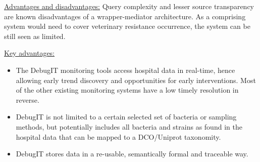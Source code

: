 \uline{Advantages and disadvantages:} Query complexity and lesser source transparency are known disadvantages of a wrapper-mediator architecture. As a comprising system would need to cover veterinary resistance occurrence, the system can be still seen as limited. 

\uline{Key advantages:}
\begin{itemize}
	\item The DebugIT monitoring tools access hospital data in real-time, hence allowing early trend discovery and opportunities for early interventions. Most of the other existing monitoring systems have a low timely resolution in reverse.
	\item DebugIT is not limited to a certain selected set of bacteria or sampling methods, but potentially includes all bacteria and strains as found in the hospital data that can be mapped to a DCO/Uniprot taxonomity.
	\item DebugIT stores data in a re-usable, semantically formal and traceable way.
\end{itemize}